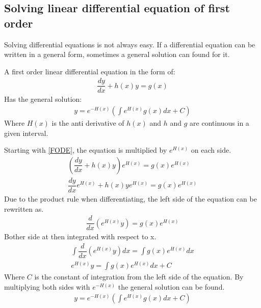 \subsection{Solving linear differential equation of first order}
Solving differential equations is not always easy. If a differential equation can be written in a general form, sometimes a general solution can found for it.
\begin{tcolorbox}[colback=green!5!white,colframe=green!40!black,title=Theorem 2.1: General solution to a linear differential equation of the first order]
A first order linear differential equation in the form of:
\begin{align} \label{FODE}
\dfrac{dy}{dx}+h(x)y=g(x)
\end{align}
Has the general solution:
\begin{align}
y=e^{-H(x)}\left(\int e^{H(x)}g(x)dx+C\right)
\end{align}
Where $H(x)$ is the anti derivative of $h(x)$ and $h$ and $g$ are continuous in a given interval.
\end{tcolorbox}
\begin{tcolorbox}[colback=gray!5!white,colframe=gray!!black,title=Proof 2.1]
Starting with \eqref{FODE}, the equation is multiplied by $e^{H(x)}$ on each side.
\begin{align*}
\left(\dfrac{dy}{dx}+h(x)y\right)e^{H(x)}=g(x)e^{H(x)}
\\
\dfrac{dy}{dx}e^{H(x)}+h(x)ye^{H(x)}=g(x)e^{H(x)}
\end{align*}
Due to the product rule when differentiating, the left side of the equation can be rewritten as.
\begin{align*}
\dfrac{d}{dx}\left(e^{H(x)}y\right)=g(x)e^{H(x)}
\end{align*}
Bother side at then integrated with respect to x.
\begin{align*}
\int\dfrac{d}{dx}\left(e^{H(x)}y\right)dx=\int g(x)e^{H(x)}dx
\\
e^{H(x)}y=\int g(x)e^{H(x)}dx+C
\end{align*}
Where $C$ is the constant of integration from the left side of the  equation. By multiplying both sides with $e^{-H(x)}$ the general solution can be found.
\begin{align}
y=e^{-H(x)}\left(\int e^{H(x)}g(x)dx+C\right)
\end{align}
\end{tcolorbox}

